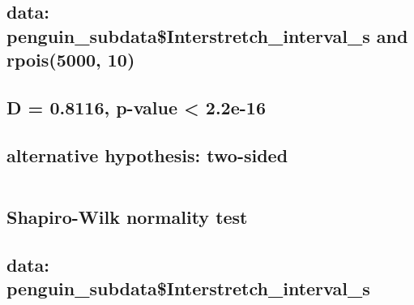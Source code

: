 \documentclass[]{article}
\begin{document}
\hypertarget{section-1}{%
\subsection{}\label{section-1}}

\hypertarget{data-penguin_subdatainterstretch_interval_s-and-rpois5000-10}{%
\subsection{data: penguin\_subdata\$Interstretch\_interval\_s and
rpois(5000,
10)}\label{data-penguin_subdatainterstretch_interval_s-and-rpois5000-10}}

\hypertarget{d-0.8116-p-value-2.2e-16}{%
\subsection{D = 0.8116, p-value \textless{}
2.2e-16}\label{d-0.8116-p-value-2.2e-16}}

\hypertarget{alternative-hypothesis-two-sided}{%
\subsection{alternative hypothesis:
two-sided}\label{alternative-hypothesis-two-sided}}

\begin{verbatim}
\end{verbatim}

\hypertarget{section-2}{%
\subsection{}\label{section-2}}

\hypertarget{shapiro-wilk-normality-test}{%
\subsection{Shapiro-Wilk normality
test}\label{shapiro-wilk-normality-test}}

\hypertarget{section-3}{%
\subsection{}\label{section-3}}

\hypertarget{data-penguin_subdatainterstretch_interval_s}{%
\subsection{data:
penguin\_subdata\$Interstretch\_interval\_s}\label{data-penguin_subdatainterstretch_interval_s}}
\end{document}
